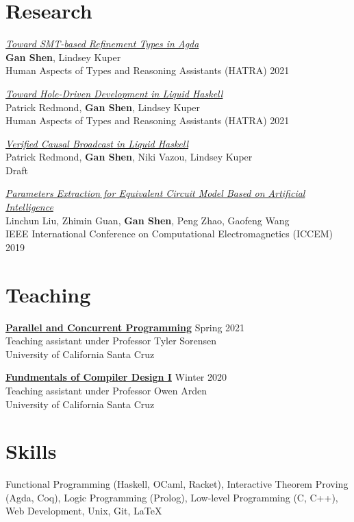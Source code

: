\documentclass[letterpaper, 11pt, oneside]{article}
\begin{document}
\section*{Research}
    \noindent \href{https://users.soe.ucsc.edu/~lkuper/papers/refinement-types-agda-hatra21.pdf}{\emph{Toward SMT-based Refinement Types in Agda}} \\
    \textbf{Gan Shen}, Lindsey Kuper \\
    Human Aspects of Types and Reasoning Assistants (HATRA) 2021

    \vspace{\baselineskip} \noindent \href{https://users.soe.ucsc.edu/~lkuper/papers/typed-holes-lh-hatra21.pdf}{\emph{Toward Hole-Driven Development in Liquid Haskell}} \\
    Patrick Redmond, \textbf{Gan Shen}, Lindsey Kuper \\
    Human Aspects of Types and Reasoning Assistants (HATRA) 2021

    \vspace{\baselineskip} \noindent \href{http://composition.al/drafts/cbcast-lh-draft.pdf}{\emph{Verified Causal Broadcast in Liquid Haskell}} \\
    Patrick Redmond, \textbf{Gan Shen}, Niki Vazou, Lindsey Kuper \\
    Draft

    \vspace{\baselineskip} \noindent \href{https://ieeexplore.ieee.org/abstract/document/8779062}{\emph{Parameters Extraction for Equivalent Circuit Model Based on Artificial Intelligence}} \\
    Linchun Liu, Zhimin Guan, \textbf{Gan Shen}, Peng Zhao, Gaofeng Wang \\
    IEEE International Conference on Computational Electromagnetics (ICCEM) 2019

\section*{Teaching}
    \href{https://sorensenucsc.github.io/CSE113-2021/index.html}{\textbf{Parallel and Concurrent Programming}} \hfill Spring 2021 \\
    Teaching assistant under Professor Tyler Sorensen \\
    University of California Santa Cruz

    \vspace{\baselineskip} \noindent \href{https://ucsc-cse-110a.github.io/winter20/}{\textbf{Fundmentals of Compiler Design I}} \hfill Winter 2020 \\
    Teaching assistant under Professor Owen Arden \\
    University of California Santa Cruz

\section*{Skills}
    Functional Programming (Haskell, OCaml, Racket), Interactive Theorem Proving (Agda, Coq), Logic Programming (Prolog), Low-level Programming (C, C++), Web Development, Unix, Git, \LaTeX
\end{document}
